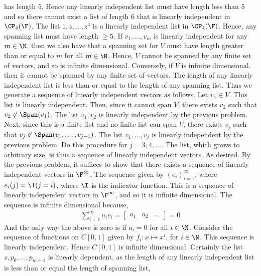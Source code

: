 \documentclass{book}
\begin{document}
\begin{enumerate}[label=\arabic*)]
        has length $5$. Hence any linearly independent list must have length less than $5$ and so there cannot exist a list of length $6$ that is linearly independent in
        $\CP_4(\F)$.
      \ii
        The list $1, z, \dots, z^4$ is a linearly independent list in $\CP_4(\F)$. Hence, any spanning list must have length $\geq 5$.
      \ii
        If $v_1, \dots, v_m$ is linearly independent for any $m \in \N$, then we also have that a spanning set for $V$ must have length greater than or equal to $m$ for all $m
        \in \N$. Hence, $V$ cannot be spanned by any finite set of vectors, and so is infinite dimensional. Conversely, if $V$ is infinite dimensional, then it cannot be
        spanned by any finite set of vectors. The length of any linearly independent list is less than or equal to the length of any spanning list. Thus we generate a
        sequence of linearly independent vectors as follows. Let $v_1 \in V$. This list is linearly independent. Then, since it cannot span $V$, there exists $v_2$ such that
        $v_2 \not\in \Span(v_1)$. The list $v_1, v_2$ is linearly independent by the previous problem. Next, since this is a finite list and no finite list can span $V$, there
        exists $v_j$ such that $v_j \not\in \Span(v_1, \dots, v_{j - 1})$. The list $v_1, \dots, v_j$ is linearly independent by the previous problem. Do this procedure for $j
        = 3, 4, \dots$. The list, which grows to arbitrary size, is thus a sequence of linearly independent vectors. As desired.
      \ii
        By the previous problem, it suffices to show that there exists a sequence of linearly independent vectors in $\F^\infty$. The sequence given by $(e_i)_{i = 1}^\infty$,
        where $e_i(j) = \I(j = i)$, where $\I$ is the indicator function. This is a sequence of linearly independent vectors in $\F^\infty$, and so it is infinite dimensional.
        The sequence is infinite dimensional because,
        \begin{align*}
          \sum_{i = 1}^{\infty}a_ie_i = \begin{bmatrix}
            a_1 & a_2 & \dots
          \end{bmatrix} = 0
        \end{align*}
        And the only way the above is zero is if $a_i = 0$ for all $i \in \N$.
      \ii
        Consider the sequence of functions on $C[0, 1]$ given by $f_i: x \mapsto x^i$, for $i \in \N$. This sequence is linearly independent. Hence $C[0, 1]$ is infinite
        dimensional.
      \ii
        Certainly the list $z, p_0, \dots, p_{m + 1}$ is linearly dependent, as the length of any linearly independent list is less than or equal the length of spanning list,

\end{enumerate}
\end{document}
